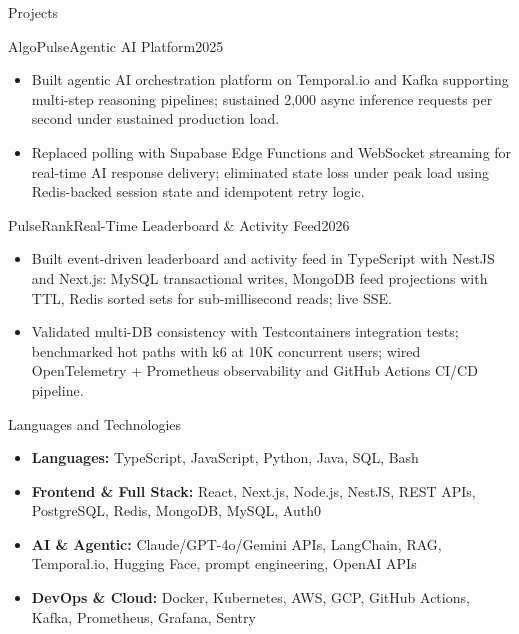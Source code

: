 \documentclass[]{mcdowellcv}
\begin{document}
\begin{cvsection}{Projects}
  \begin{cvsubsection}{AlgoPulse}{Agentic AI Platform}{2025}
    \begin{itemize}
      \item Built agentic AI orchestration platform on Temporal.io and Kafka supporting multi-step reasoning pipelines; sustained 2,000 async inference requests per second under sustained production load.
      \item Replaced polling with Supabase Edge Functions and WebSocket streaming for real-time AI response delivery; eliminated state loss under peak load using Redis-backed session state and idempotent retry logic.
    \end{itemize}
    \vspace{-1.5pt}
  \end{cvsubsection}

  \begin{cvsubsection}{PulseRank}{Real-Time Leaderboard \& Activity Feed}{2026}
    \begin{itemize}
      \item Built event-driven leaderboard and activity feed in TypeScript with NestJS and Next.js: MySQL transactional writes, MongoDB feed projections with TTL, Redis sorted sets for sub-millisecond reads; live SSE.
      \item Validated multi-DB consistency with Testcontainers integration tests; benchmarked hot paths with k6 at 10K concurrent users; wired OpenTelemetry + Prometheus observability and GitHub Actions CI/CD pipeline.
    \end{itemize}
  \end{cvsubsection}
\end{cvsection}

\begin{cvsection}{Languages and Technologies}
  \begin{cvsubsection}{}{}{}
    \begin{itemize}
      \item \textbf{Languages:} TypeScript, JavaScript, Python, Java, SQL, Bash
      \item \textbf{Frontend \& Full Stack:} React, Next.js, Node.js, NestJS, REST APIs, PostgreSQL, Redis, MongoDB, MySQL, Auth0
      \item \textbf{AI \& Agentic:} Claude/GPT-4o/Gemini APIs, LangChain, RAG, Temporal.io, Hugging Face, prompt engineering, OpenAI APIs
      \item \textbf{DevOps \& Cloud:} Docker, Kubernetes, AWS, GCP, GitHub Actions, Kafka, Prometheus, Grafana, Sentry
    \end{itemize}
  \end{cvsubsection}
\end{cvsection}
\end{document}
